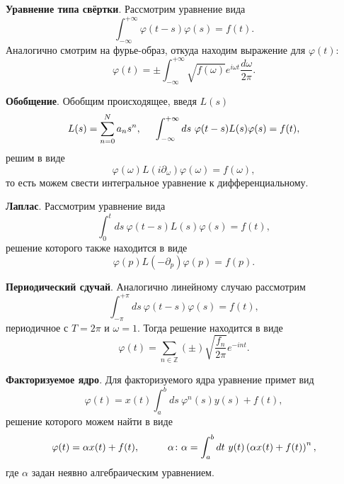 \textbf{Уравнение типа свёртки}. Рассмотрим уравнение вида
\begin{equation}
	\int_{-\infty}^{+\infty} \varphi(t-s) \varphi(s) = f(t).
\end{equation}
Аналогично смотрим на фурье-образ, откуда находим выражение для $\varphi(t)$:
\begin{equation}
	\varphi(t) = \pm \int_{-\infty}^{+\infty} \sqrt{f(\omega)} e^{i \omega t} \frac{d \omega}{2\pi}.
\end{equation}

\textbf{Обобщение}. 
Обобщим происходящее, введя $L(s)$
\begin{equation}
	L(s) = \sum_{n=0}^{N} a_n s^n,
	\hspace{5 mm} 
\int_{-\infty}^{+\infty} ds\ \varphi(t-s) L(s) \varphi(s) = f(t),
\end{equation}
решим в виде
\begin{equation}
	\varphi(\omega) L(i \partial_\omega) \varphi(\omega) = f(\omega),
\end{equation}
то есть можем свести интегральное уравнение к дифференциальному.


\textbf{Лаплас}. Рассмотрим уравнение вида
\begin{equation*}
	\int_{0}^{t} ds\ \varphi(t-s) L(s) \varphi(s) = f(t),
\end{equation*}
решение которого также находится в виде
\begin{equation*}
	\varphi(p) L(-\partial_p) \varphi(p) = f(p).
\end{equation*}


\textbf{Периодический сдучай}. Аналогично линейному случаю рассмотрим
\begin{equation*}
	\int_{-\pi}^{+\pi} ds\ \varphi(t-s) \varphi(s) = f(t),
\end{equation*}
периодичное с $T=2\pi$ и $\omega = 1$. Тогда решение находится в виде
\begin{equation*}
	\varphi(t) = \sum_{n \in \mathbb{Z}} (\pm) \sqrt{\frac{f_n}{2\pi}} e^{-int}.
\end{equation*}


\textbf{Факторизуемое ядро}. Для факторизуемого ядра уравнение примет вид
\begin{equation*}
	\varphi(t) =  x(t)\int_{a}^{b} ds\ \varphi^n (s) y(s) + f(t),
\end{equation*}
решение которого можем найти в виде
\begin{equation*}
	\varphi(t) = \alpha x(t) + f(t),
	\hspace{10 mm} 
	\alpha \colon  \alpha = \int_{a}^{b} dt\ y(t) \left(
		\alpha x(t) + f(t)
	\right)^n,
\end{equation*}
где $\alpha$ задан неявно алгебраическим уравнением.

